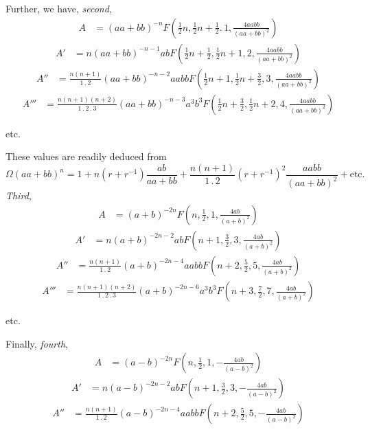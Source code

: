 Further, we have, \textit{second},
\[
\begin{array}{rl}
A&=(aa+bb)^{-n}F(\frac12 n,\frac12 n+\frac12 .\,1,\frac{4aabb}{(aa+bb)^2})
\end{array}
\]
\[
\begin{array}{rl}
A'&=n(aa+bb)^{-n-1}abF(\frac12 n+\frac12,\frac12 n+1,2,\frac{4aabb}{(aa+bb)^2})
\end{array}
\]
\[
\begin{array}{rl}
A''&=\frac{n(n+1)}{1\mathbin{.}2}(aa+bb)^{-n-2}aabbF(\frac12 n+1,\frac12 n+\frac32,3,\frac{4aabb}{(aa+bb)^2})
\end{array}
\]
\[
\begin{array}{rl}
A'''&=\frac{n(n+1)(n+2)}{1\mathbin{.}2\mathbin{.}3}(aa+bb)^{-n-3}a^3b^3F(\frac12 n+\frac32,\frac12 n+2,4,\frac{4aabb}{(aa+bb)^2})
\end{array}
\]
\begin{center}etc.\end{center}
These values are readily deduced from
\[
\Omega(aa+bb)^n=1+n(r+r^{-1})\frac{ab}{aa+bb}+\frac{n(n+1)}{1\mathbin{.}2}(r+r^{-1})^2\frac{aabb}{(aa+bb)^2}+\mathrm{etc.}
\]
\textit{Third},
\[
\begin{array}{rl}
A&=(a+b)^{-2n}F(n,\frac12,1,\frac{4ab}{(a+b)^2})
\end{array}
\]
\[
\begin{array}{rl}
A'&=n(a+b)^{-2n-2}abF(n+1,\frac32,3,\frac{4ab}{(a+b)^2})
\end{array}
\]
\[
\begin{array}{rl}
A''&=\frac{n(n+1)}{1\mathbin{.}2}(a+b)^{-2n-4}aabbF(n+2,\frac52,5,\frac{4ab}{(a+b)^2})
\end{array}
\]
\[
\begin{array}{rl}
A'''&=\frac{n(n+1)(n+2)}{1\mathbin{.}2\mathbin{.}3}(a+b)^{-2n-6}a^3b^3F(n+3,\frac72,7,\frac{4ab}{(a+b)^2})
\end{array}
\]
\begin{center}etc.\end{center}
Finally, \textit{fourth},
\[
\begin{array}{rl}
A&=(a-b)^{-2n}F(n,\frac12,1,-\frac{4ab}{(a-b)^2})
\end{array}
\]
\[
\begin{array}{rl}
A'&=n(a-b)^{-2n-2}abF(n+1,\frac32,3,-\frac{4ab}{(a-b)^2})
\end{array}
\]
\[
\begin{array}{rl}
A''&=\frac{n(n+1)}{1\mathbin{.}2}(a-b)^{-2n-4}aabbF(n+2,\frac52,5,-\frac{4ab}{(a-b)^2})
\end{array}
\]
